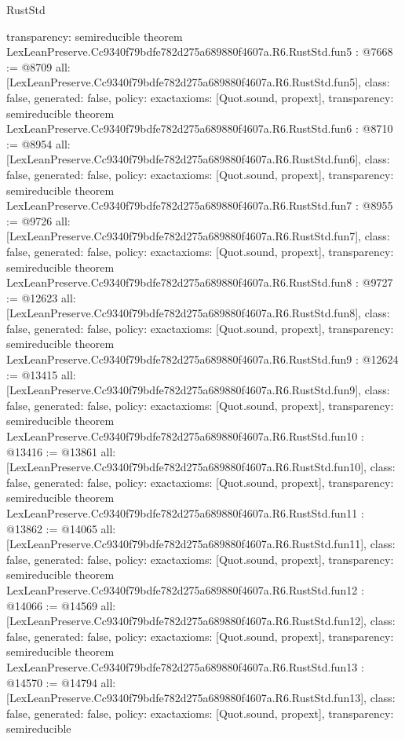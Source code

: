 \begin{lexlean}{RustStd}
\begin{coremodule}
{  transparency: semireducible
}
theorem LexLeanPreserve.Cc9340f79bdfe782d275a689880f4607a.R6.RustStd.fun5 : @7668 := @8709 {
  all: [LexLeanPreserve.Cc9340f79bdfe782d275a689880f4607a.R6.RustStd.fun5],
  class: false,
  generated: false,
  policy: exact{axioms: [Quot.sound, propext]},
  transparency: semireducible
}
theorem LexLeanPreserve.Cc9340f79bdfe782d275a689880f4607a.R6.RustStd.fun6 : @8710 := @8954 {
  all: [LexLeanPreserve.Cc9340f79bdfe782d275a689880f4607a.R6.RustStd.fun6],
  class: false,
  generated: false,
  policy: exact{axioms: [Quot.sound, propext]},
  transparency: semireducible
}
theorem LexLeanPreserve.Cc9340f79bdfe782d275a689880f4607a.R6.RustStd.fun7 : @8955 := @9726 {
  all: [LexLeanPreserve.Cc9340f79bdfe782d275a689880f4607a.R6.RustStd.fun7],
  class: false,
  generated: false,
  policy: exact{axioms: [Quot.sound, propext]},
  transparency: semireducible
}
theorem LexLeanPreserve.Cc9340f79bdfe782d275a689880f4607a.R6.RustStd.fun8 : @9727 := @12623 {
  all: [LexLeanPreserve.Cc9340f79bdfe782d275a689880f4607a.R6.RustStd.fun8],
  class: false,
  generated: false,
  policy: exact{axioms: [Quot.sound, propext]},
  transparency: semireducible
}
theorem LexLeanPreserve.Cc9340f79bdfe782d275a689880f4607a.R6.RustStd.fun9 : @12624 := @13415 {
  all: [LexLeanPreserve.Cc9340f79bdfe782d275a689880f4607a.R6.RustStd.fun9],
  class: false,
  generated: false,
  policy: exact{axioms: [Quot.sound, propext]},
  transparency: semireducible
}
theorem LexLeanPreserve.Cc9340f79bdfe782d275a689880f4607a.R6.RustStd.fun10 : @13416 := @13861 {
  all: [LexLeanPreserve.Cc9340f79bdfe782d275a689880f4607a.R6.RustStd.fun10],
  class: false,
  generated: false,
  policy: exact{axioms: [Quot.sound, propext]},
  transparency: semireducible
}
theorem LexLeanPreserve.Cc9340f79bdfe782d275a689880f4607a.R6.RustStd.fun11 : @13862 := @14065 {
  all: [LexLeanPreserve.Cc9340f79bdfe782d275a689880f4607a.R6.RustStd.fun11],
  class: false,
  generated: false,
  policy: exact{axioms: [Quot.sound, propext]},
  transparency: semireducible
}
theorem LexLeanPreserve.Cc9340f79bdfe782d275a689880f4607a.R6.RustStd.fun12 : @14066 := @14569 {
  all: [LexLeanPreserve.Cc9340f79bdfe782d275a689880f4607a.R6.RustStd.fun12],
  class: false,
  generated: false,
  policy: exact{axioms: [Quot.sound, propext]},
  transparency: semireducible
}
theorem LexLeanPreserve.Cc9340f79bdfe782d275a689880f4607a.R6.RustStd.fun13 : @14570 := @14794 {
  all: [LexLeanPreserve.Cc9340f79bdfe782d275a689880f4607a.R6.RustStd.fun13],
  class: false,
  generated: false,
  policy: exact{axioms: [Quot.sound, propext]},
  transparency: semireducible
}
\end{coremodule}
\end{lexlean}
